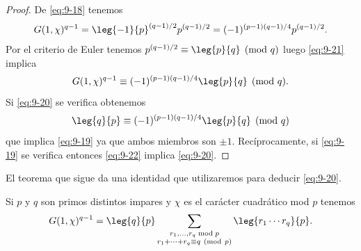 \documentclass[12pt,a4paper]{book}
\begin{document}
    \begin{proof}
        De \eqref{eq:9-18} tenemos
        \begin{equation}\label{eq:9-21}
            G(1,\chi)^{q-1}=\leg{-1}{p}^{(q-1)/2}p^{(q-1)/2}=(-1)^{(p-1)(q-1)/4}p^{(q-1)/2}.
        \end{equation}
        Por el criterio de Euler tenemos $p^{(q-1)/2}\equiv\leg{p}{q}\pmod{q}$ luego
        \eqref{eq:9-21} implica
        \begin{equation}\label{eq:9-22}
            G(1,\chi)^{q-1}\equiv(-1)^{(p-1)(q-1)/4}\leg{p}{q}\pmod{q}.
        \end{equation}
        Si \eqref{eq:9-20} se verifica obtenemos
        \begin{equation*}
            \leg{q}{p}\equiv(-1)^{(p-1)(q-1)/4}\leg{p}{q}\pmod{q}
        \end{equation*}
        que implica \eqref{eq:9-19} ya que ambos miembros son $\pm1$. Recíprocamente, si
        \eqref{eq:9-19} se verifica entonces \eqref{eq:9-22} implica \eqref{eq:9-20}.
    \end{proof}

    El teorema que sigue da una identidad que utilizaremos para deducir \eqref{eq:9-20}.

    \begin{teorema}\label{teo:9-15}
        Si $p$ y $q$ son primos distintos impares y $\chi$ es el carácter cuadrático mod
        $p$ tenemos
        \begin{equation}\label{eq:9-23}
            G(1,\chi)^{q-1}=\leg{q}{p}\sum_{\substack{r_{1},\dots,r_{q}\bmod p\\r_{1}+\cdots+r_{q}\equiv q\ (\mathrm{mod}\ p)}}\leg{r_{1}\cdots r_{q}}{p}.
        \end{equation}
    \end{teorema}
\end{document}
